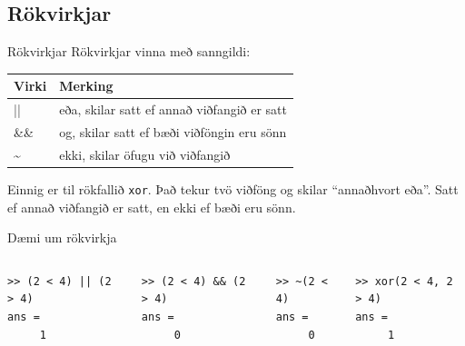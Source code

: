 \documentclass{beamer}
\begin{document}
\subsection{Rökvirkjar}
\begin{frame}{Rökvirkjar}
Rökvirkjar vinna með sanngildi:
\begin{center}
\begin{tabular}{ll}
\toprule
Virki&Merking\\
\midrule
||& eða\footnotemark, skilar satt ef annað viðfangið er satt\\
\&\& & og\footnotemark[1], skilar satt ef bæði viðföngin eru sönn\\
\~{} &ekki, skilar öfugu við viðfangið\\
\bottomrule
\end{tabular}
\end{center}
Einnig er til rökfallið \texttt{xor}. Það tekur tvö viðföng og skilar ``annaðhvort eða''. Satt ef annað viðfangið er satt, en ekki ef bæði eru sönn.
\end{frame}

\begin{frame}[fragile]{Dæmi um rökvirkja}
\begin{columns}
\begin{verbatim}
>> (2 < 4) || (2 > 4)
ans =
     1
\end{verbatim}
\begin{verbatim}
>> (2 < 4) && (2 > 4)
ans =
     0
\end{verbatim}
\begin{verbatim}
>> ~(2 < 4)
ans =
     0
\end{verbatim}
\begin{verbatim}
>> xor(2 < 4, 2 > 4)
ans =
     1
\end{verbatim}
\end{columns}
\end{frame}
\end{document}
